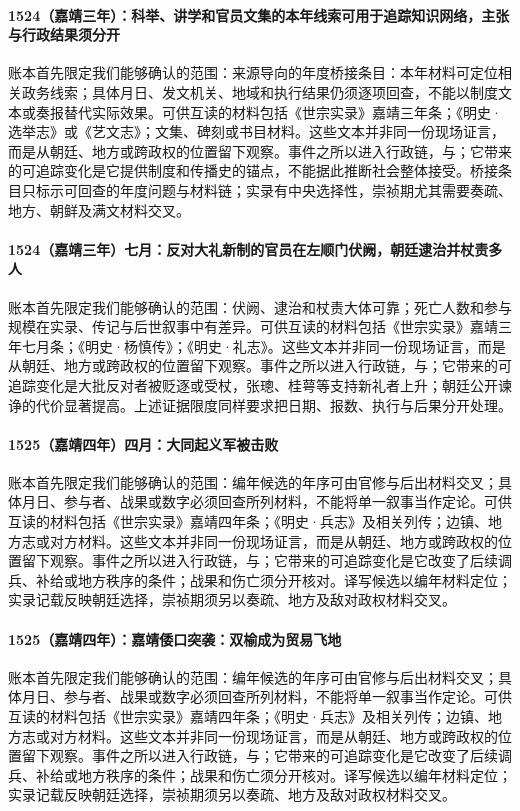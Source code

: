 \paragraph{1524（嘉靖三年）：科举、讲学和官员文集的本年线索可用于追踪知识网络，主张与行政结果须分开} 账本首先限定我们能够确认的范围：来源导向的年度桥接条目：本年材料可定位相关政务线索；具体月日、发文机关、地域和执行结果仍须逐项回查，不能以制度文本或奏报替代实际效果。可供互读的材料包括《世宗实录》嘉靖三年条；《明史·选举志》或《艺文志》；文集、碑刻或书目材料。这些文本并非同一份现场证言，而是从朝廷、地方或跨政权的位置留下观察。事件之所以进入行政链，与；它带来的可追踪变化是它提供制度和传播史的锚点，不能据此推断社会整体接受。桥接条目只标示可回查的年度问题与材料链；实录有中央选择性，崇祯期尤其需要奏疏、地方、朝鲜及满文材料交叉。

\paragraph{1524（嘉靖三年）七月：反对大礼新制的官员在左顺门伏阙，朝廷逮治并杖责多人} 账本首先限定我们能够确认的范围：伏阙、逮治和杖责大体可靠；死亡人数和参与规模在实录、传记与后世叙事中有差异。可供互读的材料包括《世宗实录》嘉靖三年七月条；《明史·杨慎传》；《明史·礼志》。这些文本并非同一份现场证言，而是从朝廷、地方或跨政权的位置留下观察。事件之所以进入行政链，与；它带来的可追踪变化是大批反对者被贬逐或受杖，张璁、桂萼等支持新礼者上升；朝廷公开谏诤的代价显著提高。上述证据限度同样要求把日期、报数、执行与后果分开处理。

\paragraph{1525（嘉靖四年）四月：大同起义军被击败} 账本首先限定我们能够确认的范围：编年候选的年序可由官修与后出材料交叉；具体月日、参与者、战果或数字必须回查所列材料，不能将单一叙事当作定论。可供互读的材料包括《世宗实录》嘉靖四年条；《明史·兵志》及相关列传；边镇、地方志或对方材料。这些文本并非同一份现场证言，而是从朝廷、地方或跨政权的位置留下观察。事件之所以进入行政链，与；它带来的可追踪变化是它改变了后续调兵、补给或地方秩序的条件；战果和伤亡须分开核对。译写候选以编年材料定位；实录记载反映朝廷选择，崇祯期须另以奏疏、地方及敌对政权材料交叉。

\paragraph{1525（嘉靖四年）：嘉靖倭口突袭：双榆成为贸易飞地} 账本首先限定我们能够确认的范围：编年候选的年序可由官修与后出材料交叉；具体月日、参与者、战果或数字必须回查所列材料，不能将单一叙事当作定论。可供互读的材料包括《世宗实录》嘉靖四年条；《明史·兵志》及相关列传；边镇、地方志或对方材料。这些文本并非同一份现场证言，而是从朝廷、地方或跨政权的位置留下观察。事件之所以进入行政链，与；它带来的可追踪变化是它改变了后续调兵、补给或地方秩序的条件；战果和伤亡须分开核对。译写候选以编年材料定位；实录记载反映朝廷选择，崇祯期须另以奏疏、地方及敌对政权材料交叉。

